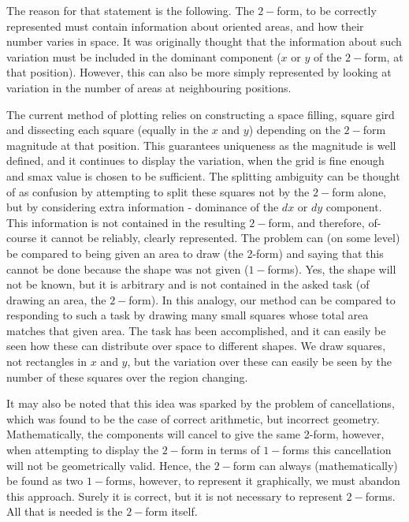 \documentclass[12pt]{report}
\begin{document}
The reason for that statement is the following. The $2-$form, to be correctly represented must contain information about oriented areas, and how their number varies in space. It was originally thought that the information about such variation must be included in the dominant component ($x$ or $y$ of the $2-$form, at that position). However, this can also be more simply represented by looking at variation in the number of areas at neighbouring positions.

The current method of plotting relies on constructing a space filling, square gird and dissecting each square (equally in the $x$ and $y$) depending on the $2-$form magnitude at that position. This guarantees uniqueness as the magnitude is well defined, and it continues to display the variation, when the grid is fine enough and s\textunderscore max value is chosen to be sufficient.
The splitting ambiguity can be thought of as confusion by attempting to split these squares not by the $2-$form alone, but by considering extra information - dominance of the $dx$ or $dy$ component. This information is not contained in the resulting $2-$form, and therefore, of-course it cannot be reliably, clearly represented.
The problem can (on some level) be compared to being given an area to draw (the 2-form) and saying that this cannot be done because the shape was not given ($1-$forms). Yes, the shape will not be known, but it is arbitrary and is not contained in the asked task (of drawing an area, the $2-$form). In this analogy, our method can be compared to responding to such a task by drawing many small squares whose total area matches that given area. The task has been accomplished, and it can easily be seen how these can distribute over space to different shapes. We draw squares, not rectangles in $x$ and $y$, but the variation over these can easily be seen by the number of these squares over the region changing.

It may also be noted that this idea was sparked by the problem of cancellations, which was found to be the case of correct arithmetic, but incorrect geometry. Mathematically, the components will cancel to give the same 2-form, however, when attempting to display the $2-$form in terms of $1-$forms this cancellation will not be geometrically valid.
Hence, the $2-$form can always (mathematically) be found as two $1-$forms, however, to represent it graphically, we must abandon this approach. Surely it is correct, but it is not necessary to represent $2-$forms. All that is needed is the $2-$form itself.
\end{document}
